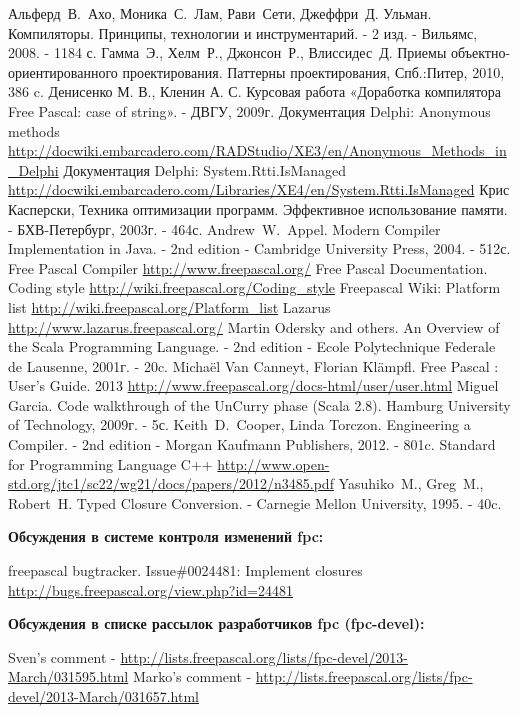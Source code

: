 \documentclass{imcs}
\begin{document}
\pagebreak

\begin{thebibliography}{99}
 Альферд~В.~Ахо, Моника~С.~Лам, Рави~Сети, Джеффри~Д. Ульман. Компиляторы. Принципы, технологии и инструментарий. - 2 изд. - Вильямс, 2008. - 1184 с.
 Гамма~Э., Хелм~Р., Джонсон~Р., Влиссидес~Д. Приемы объектно-ориентированного проектирования. Паттерны проектирования, Спб.:Питер, 2010, 386 c.
 Денисенко М. В., Кленин А. С. Курсовая работа «Доработка компилятора Free Pascal: case of string». - ДВГУ, 2009г.
 Документация Delphi: Anonymous methods \url{http://docwiki.embarcadero.com/RADStudio/XE3/en/Anonymous_Methods_in_Delphi}
 Документация Delphi: System.Rtti.IsManaged \url{http://docwiki.embarcadero.com/Libraries/XE4/en/System.Rtti.IsManaged}
 Крис Касперски, Техника оптимизации программ. Эффективное использование памяти. - БХВ-Петербург, 2003г. - 464с.
 Andrew~W.~Appel. Modern Compiler Implementation in Java. - 2nd edition - Cambridge University Press, 2004. - 512с.
 Free Pascal Compiler \url{http://www.freepascal.org/}
 Free Pascal Documentation. Coding style \url{http://wiki.freepascal.org/Coding_style}
 Freepascal Wiki: Platform list \url{http://wiki.freepascal.org/Platform_list}
 Lazarus \url{http://www.lazarus.freepascal.org/}
 Martin Odersky and others. An Overview of the Scala Programming Language. - 2nd edition - Ecole Polytechnique Federale de Lausenne, 2001г. - 20c.
 Michaël Van Canneyt, Florian Klämpfl. Free Pascal : User’s Guide. 2013 \url{http://www.freepascal.org/docs-html/user/user.html}
 Miguel Garcia. Code walkthrough of the UnCurry phase (Scala 2.8). Hamburg University of Technology, 2009г. - 5с.
 Keith~D.~Cooper, Linda Torczon. Engineering a Compiler. - 2nd edition - Morgan Kaufmann Publishers, 2012. - 801c.
 Standard for Programming Language C++ \url{http://www.open-std.org/jtc1/sc22/wg21/docs/papers/2012/n3485.pdf}
 Yasuhiko~M., Greg~M., Robert~H. Typed  Closure Conversion. - Carnegie Mellon University, 1995. - 40c.

{\bf Обсуждения в системе контроля изменений fpc:}  
  
 freepascal bugtracker. Issue\#0024481: Implement closures \url{http://bugs.freepascal.org/view.php?id=24481}
  
{\bf Обсуждения в списке рассылок разработчиков fpc (fpc-devel):}

 Sven's comment - \url{http://lists.freepascal.org/lists/fpc-devel/2013-March/031595.html}
 Marko's comment - \url{http://lists.freepascal.org/lists/fpc-devel/2013-March/031657.html}


  
\end{thebibliography}
\end{document}
